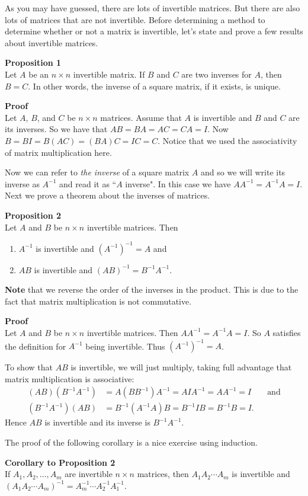\documentclass[12pt]{article}
\def\it{\item}
\def\be{\begin{enumerate}} \def\ee{\end{enumerate}}
\begin{document}
As you may have guessed, there are lots of invertible matrices. But there are also lots of matrices that are not invertible. Before determining a method to determine whether or not a matrix is invertible, let's state and prove a few results about invertible matrices.

\noindent
{\bf Proposition 1} \\
Let $A$ be an $n \times n$ invertible matrix. If $B$ and $C$ are two inverses for $A$, then $B = C$. In other words, the inverse of a square matrix, if it exists, is unique.

\noindent
{\bf Proof} \\
Let $A$, $B$, and $C$ be $n \times n$ matrices. Assume that $A$ is invertible and $B$ and $C$ are its inverses. So we have that $AB = BA = AC = CA = I$. Now
$B = BI = B(AC) = (BA)C = IC = C$. Notice that we used the associativity of matrix multiplication here.

Now we can refer to {\itshape the inverse} of a square matrix $A$ and so we will write its inverse as $A^{-1}$ and read it as ``$A$ inverse". In this case
we have $AA^{-1} = A^{-1}A = I$. Next we prove a theorem about the inverses of matrices.

\noindent
{\bf Proposition 2} \\
Let $A$ and $B$ be $n \times n$ invertible matrices. Then 
\be
\it $A^{-1}$ is invertible and $(A^{-1})^{-1} = A$ and
\it $AB$ is invertible and $(AB)^{-1} = B^{-1}A^{-1}$.
\ee
{\bf Note} that we reverse the order of the inverses in the product. This is due to the fact that matrix multiplication is not commutative.

\noindent
{\bf Proof} \\
Let $A$ and $B$ be $n \times n$ invertible matrices. Then $AA^{-1} = A^{-1}A = I$. So $A$ satisfies the definition for $A^{-1}$ being invertible. Thus $(A^{-1})^{-1} = A$. 

To show that $AB$ is invertible, we will just multiply, taking full advantage that matrix multiplication is associative:
\begin{align*}
(AB)(B^{-1}A^{-1}) &= A(BB^{-1})A^{-1} = AIA^{-1} = AA^{-1} = I &&\text{and} \\
(B^{-1}A^{-1})(AB) &= B^{-1}(A^{-1}A)B = B^{-1}IB = B^{-1}B = I. 
\end{align*}
Hence $AB$ is invertible and its inverse is $B^{-1}A^{-1}$.

The proof of the following corollary is a nice exercise using induction.

\noindent
{\bf Corollary to Proposition 2} \\
If $A_1, A_2, \ldots, A_m$ are invertible $n \times n$ matrices, then $A_1 A_2 \cdots A_m$ is invertible and $(A_1 A_2 \cdots A_m)^{-1} = A_{m}^{-1} \cdots A_{2}^{-1} A_{1}^{-1}$.
\end{document}
